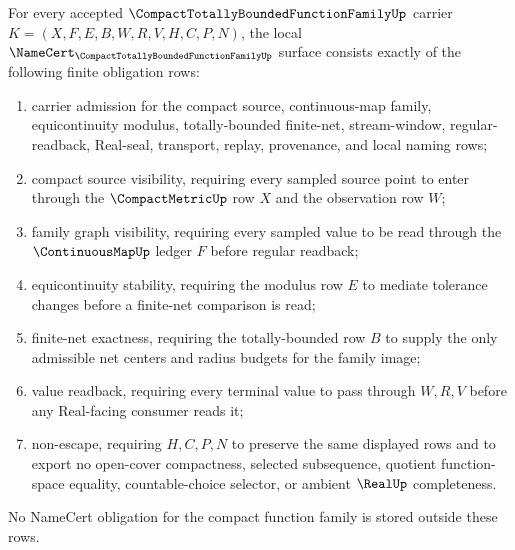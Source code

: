 \begin{theorem}
\label{thm:compact-totally-bounded-function-family-namecert-obligations}
For every accepted $\CompactTotallyBoundedFunctionFamilyUp$ carrier $K=(X,F,E,B,W,R,V,H,C,P,N)$, the local $\NameCert_{\CompactTotallyBoundedFunctionFamilyUp}$ surface consists exactly of the following finite obligation rows:
\begin{enumerate}
\item carrier admission for the compact source, continuous-map family, equicontinuity modulus, totally-bounded finite-net, stream-window, regular-readback, Real-seal, transport, replay, provenance, and local naming rows;
\item compact source visibility, requiring every sampled source point to enter through the $\CompactMetricUp$ row $X$ and the observation row $W$;
\item family graph visibility, requiring every sampled value to be read through the $\ContinuousMapUp$ ledger $F$ before regular readback;
\item equicontinuity stability, requiring the modulus row $E$ to mediate tolerance changes before a finite-net comparison is read;
\item finite-net exactness, requiring the totally-bounded row $B$ to supply the only admissible net centers and radius budgets for the family image;
\item value readback, requiring every terminal value to pass through $W,R,V$ before any Real-facing consumer reads it;
\item non-escape, requiring $H,C,P,N$ to preserve the same displayed rows and to export no open-cover compactness, selected subsequence, quotient function-space equality, countable-choice selector, or ambient $\RealUp$ completeness.
\end{enumerate}
No NameCert obligation for the compact function family is stored outside these rows.
\end{theorem}
